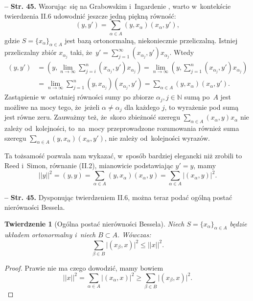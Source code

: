 \documentclass[a4paper,11pt]{article}
\newtheorem{twr}{Twierdzenie}
\newcommand{\mb}{\mathbb}
\newcommand{\ra}{\rightarrow}
\newcommand{\al}{\alpha}
\newcommand{\be}{\beta}
\newcommand{\N}{\mb{N}}
\newcommand{\subs}{\subset}
\newcommand{\Lim}{\lim\limits}
\newcommand{\Sum}{\sum\limits}
\providecommand{\absj}[1]{\lvert #1 \rvert}
\newcommand{\norm}[1]{\left|\left| #1 \right|\right|}
\newcommand{\tb}{\textbf}
\newcommand{\noi}{\noindent}
\newcommand{\start}{\noi \tb{--} {}}
\newcommand{\Str}[1]{\tb{Str. #1.}}
\begin{document}
\start \Str{45} Wzorując~się na Grabowskim i~Ingardenie
\cite{GrabowskiIngarden87}, warto w~kontekście twierdzenia II.6
udowodnić jeszcze jedną piękną równość:
\begin{displaymath}
  ( y, y' ) = \Sum_{ \al \in A } ( y, x_{ \al } )( x_{ \al }, y' ),
\end{displaymath}
gdzie $S = \{ x_{ \al } \}_{ \al \in A }$ jest bazą ortonormalną,
niekoniecznie przeliczalną. Istniej przeliczalny zbiór
$x_{ \al_{ j } }$ taki,
że~$y' = \Sum_{ j = 1 }^{ \infty } ( x_{ \al_{ j } }, y' ) x_{ \al_{ j
  } }$. Wtedy
\begin{equation*}
  \begin{split}
    ( y, y' ) &= ( y, \Lim_{ n \ra \infty } \Sum_{ j = i }^{ n } ( x_{
      \al_{ j } }, y' ) x_{ \al_{ j } } ) = \Lim_{ n \ra \infty
    } ( y, \Sum_{ j = 1 }^{ n } ( x_{ \al_{ j } }, y' ) x_{ \al_{ j } } ) \\
    &= \Lim_{ n \ra \infty } \Sum_{ j = 1 }^{ n } ( y, x_{ \al_{ j } }
    ) ( x_{ \al_{ j } }, y' ) %
    = \Sum_{ \al \in A } ( y, x_{ \al } )( x_{ \al }, y' ).
  \end{split}
\end{equation*}
Zastąpienie w~ostatniej równości sumy po zbiorze
$\alpha_{ j }, j \in \N$ sumą po~$A$ jest możliwe na mocy tego,
że~jeżeli $\alpha \neq \alpha_{ j }$ dla każdego $j$, to wyrażenie pod
sumą jest równe zeru. Zauważmy też, że~skoro zbieżność szeregu
$\sum_{ \al \in A } ( x_{ \al }, y ) x_{ \al }$ nie zależy
od~kolejności, to~na~mocy przeprowadzone rozumowania również suma
szeregu $\sum_{ \al \in A } ( y, x_{ \al } )( x_{ \al }, y' )$, nie
zależy od~kolejności wyrazów.

Ta tożsamość pozwala nam wykazać, w~sposób bardziej elegancki niż
zrobili to Reed i~Simon, równanie (II.2), mianowicie podstawiając
$y' = y$, mamy
\begin{equation*}
  \norm{ y }^{ 2 } = ( y, y ) = \Sum_{ \al \in A } ( y, x_{ \al } )
  ( x_{ \al }, y ) = \Sum_{ \al \in A } \absj{ ( x_{ \al }, y ) }^{ 2 }.
\end{equation*}

\start \Str{45} Dysponując twierdzeniem II.6, można teraz podać ogólną
postać nierówności Bessela.

\begin{twr}[Ogólna postać nierówności Bessela]
  Niech $S = \{ x_{ \al } \}_{ \al \in A }$ będzie układem
  ortonormalny i~niech $B \subs A$. Wówczas:
  \begin{equation*}
    \Sum_{ \be \in B } \absj{ ( x_{ \be }, x ) }^{ 2 } \leq \norm{ x }^{ 2 }.
  \end{equation*}
\end{twr}
\begin{proof}
  Prawie nie ma czego dowodzić, mamy bowiem
  \begin{equation*}
    \norm{ x }^{ 2 } = \Sum_{ \al \in A } \absj{ ( x_{ \al }, x ) }^{ 2 }
    \geq \Sum_{ \be \in B } \absj{ ( x_{ \be }, x ) }^{ 2 }.
  \end{equation*}
\end{proof}
\end{document}
